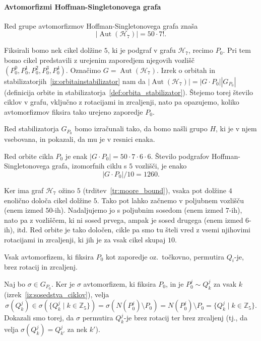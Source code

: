 \documentclass[fin1, tisk]{fmfdelo}
\newcommand{\hof}{\mathscr{H}_{7}}
\newcommand{\aut}{\operatorname{Aut}}
\begin{document}
\paragraph{Avtomorfizmi Hoffman-Singletonovega grafa}
\begin{trditev}\label{tr:red_avtomorfizmov}
    Red grupe avtomorfizmov Hoffman-Singletonovega grafa znaša \[|\aut(\hof)| = 50\cdot 7!.\]
\end{trditev}

Fiksirali bomo nek cikel dolžine $5$, ki je podgraf v grafu $\hof$, recimo $P_0$. 
Pri tem bomo cikel predstavili z urejenim zaporedjem njegovih vozlišč $(P_0^0, P_0^1, P_0^2, P_0^3, P_0^4)$.
Označimo $G = \aut(\hof)$. Izrek o
orbitah in stabilizatorjih~\ref{iz:orbitainstabilizator} nam da $|\aut(\hof)| = |G\cdot P_0||G_{P_0}|$ 
(definicija orbite in stabilizatorja~\ref{def:orbita_stabilizator}).
Štejemo torej število ciklov v grafu, vključno z rotacijami in zrcaljenji, nato pa
opazujemo, koliko avtomorfizmov fiksira tako urejeno zaporedje $P_0$.

Red stabilizatorja $G_{P_0}$ bomo izračunali tako, da bomo našli grupo $H$, ki
je v njem vsebovana, in pokazali, da mu je v resnici enaka.

\begin{lema}
    Red orbite cikla $P_0$ je enak $|G\cdot P_0| = 50\cdot 7\cdot 6\cdot 6$. Število podgrafov Hoffman-Singletonovega grafa, izomorfnih ciklu s $5$ vozlišči,
    je enako $$|G\cdot P_0|/10 = 1260.$$
\end{lema}
\begin{dokaz}
    Ker ima graf $\hof$ ožino $5$ (trditev~\ref{tr:moore_bound}), 
    vsaka pot dolžine $4$ enolično določa
    cikel dolžine $5$. Tako pot lahko začnemo v poljubnem vozlišču (enem izmed $50$-ih). Nadaljujemo
    jo s poljubnim sosedom (enem izmed $7$-ih), nato pa z vozliščem, ki ni sosed prvega, 
    ampak je sosed drugega (enem izmed $6$-ih), itd.
    Red orbite je tako določen, cikle pa smo tu šteli vred z 
    vsemi njihovimi rotacijami in zrcaljenji, ki jih je za vsak cikel skupaj $10$.
\end{dokaz}

\begin{lema}\label{le:permutira_qi_je}
    Vsak avtomorfizem, ki fiksira $P_0$ kot zaporedje oz.~točkovno, permutira $Q_i$-je, brez rotacij in zrcaljenj.
\end{lema}
\begin{dokaz}
     Naj bo $\sigma \in G_{P_0}$. Ker je $\sigma$ avtomorfizem, ki fiksira $P_0$, 
     in je $P_0^j \sim Q_k^j$ za vsak $k$ (izrek~\ref{iz:sosedstva_ciklov}), velja 
     $$\sigma(Q_k^j) \in \sigma(\{Q_k^j\mid k\in\mathbb{Z}_5\}) = \sigma(N(P_0^j)\setminus P_0) = N(P_0^j)\setminus P_0 = \{Q_k^j\mid k\in\mathbb{Z}_5\}.$$
     Dokazali smo torej, da $\sigma$ permutira $Q_k^j$-je brez rotacij ter brez zrcaljenj (tj., da velja $\sigma(Q_k^j) = Q_{k'}^j$ za nek $k'$).
\end{dokaz}
\end{document}
